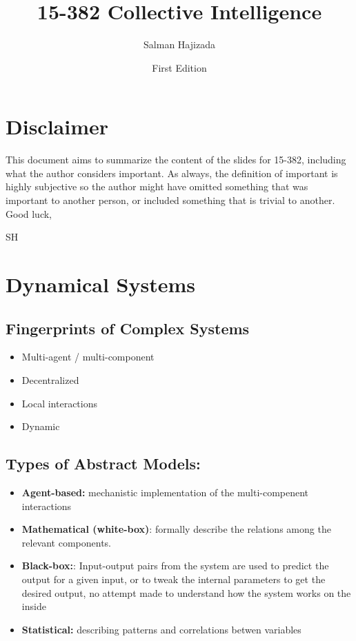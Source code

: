 \documentclass{report}
\title{15-382 Collective Intelligence}
\date{First Edition}
\author{Salman Hajizada}
\begin{document}
\maketitle

\setcounter{chapter}{-1}
\chapter*{Disclaimer}
This document aims to summarize the content of the slides for 15-382, including
what the author considers important. As always, the definition of important is
highly subjective so the author might have omitted something that was
important to another person, or included something that is trivial to another.\\

Good luck,

SH

\chapter*{Dynamical Systems}

\section*{Fingerprints of Complex Systems}

\begin{itemize}
    \item Multi-agent / multi-component
    \item Decentralized
    \item Local interactions
    \item Dynamic
\end{itemize}

\section*{Types of Abstract Models:}

\begin{itemize}
    \item \textbf{Agent-based:} mechanistic implementation of the multi-compenent interactions
    \item \textbf{Mathematical (white-box)}: formally describe the relations among the relevant components.
    \item \textbf{Black-box:}: Input-output pairs from the system are used to predict the output for a given input, or to tweak the internal parameters to get the desired output, no attempt made to understand how the system works on the inside
    \item \textbf{Statistical:} describing patterns and correlations betwen variables
\end{itemize}
\end{document}
